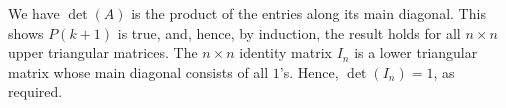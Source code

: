 \begin{enumerate}
We have $\det(A)$ is the product of the entries along its main diagonal.  This shows $P(k+1)$ is true, and, hence, by induction, the result holds for all $n \times n$ upper triangular matrices. The $n \times n$ identity matrix $I_{n}$ is a lower triangular matrix whose main diagonal consists of all $1$'s.  Hence,  $\det\left(I_{n}\right) = 1$, as required.

\end{enumerate}


